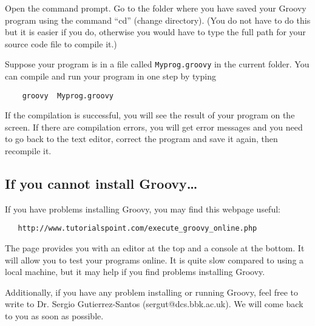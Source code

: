 Open the command prompt. 
Go to the folder where you have saved your Groovy
program using the command ``cd'' (change directory). (You do not have to
do this but it is easier if you do, otherwise you would have to type the full
path for your source code file to compile it.)

Suppose your program is in a file called 
\texttt{Myprog.groovy} in the current folder. 
You can compile and run your program in one step by typing 

\begin{Verbatim}
    groovy  Myprog.groovy
\end{Verbatim}

If the compilation is successful, you will see the result of your
program on the screen.
%
If there are compilation errors, you will get error messages and you need
to go back to the text editor, correct the program and save it again,
then recompile it. 



\subsection*{If you cannot install Groovy\ldots}
\label{sec:if-you-cannot}

If you have problems installing Groovy, you may find this webpage useful:

\begin{verbatim}
   http://www.tutorialspoint.com/execute_groovy_online.php
\end{verbatim}

The page provides you with an editor at the top and a console at the
bottom. It will allow you to test your programs online. It is quite
slow compared to using a local machine, but it may help if you find
problems installing Groovy. 

Additionally, if you have any problem installing or running Groovy,
feel free to write to Dr. Sergio Gutierrez-Santos
(sergut@dcs.bbk.ac.uk). We will come back to you as soon as possible.


